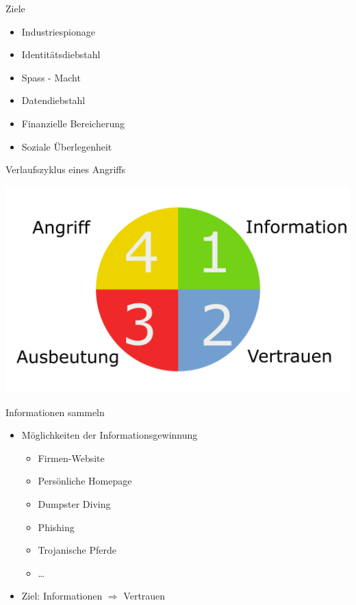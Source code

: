 \documentclass[11pt]{beamer}
\begin{document}
\begin{frame}{Ziele}
  \begin{itemize}
    \item Industriespionage
    \item Identitätsdiebstahl
    \item Spass - Macht
    \item Datendiebstahl
    \item Finanzielle Bereicherung
    \item Soziale Überlegenheit
  \end{itemize}
\end{frame}

\begin{frame}[t]{Verlaufszyklus eines Angriffs}
  \begin{center}
    \includegraphics[height=0.75\textheight]{cycle}
  \end{center}
\end{frame}

\begin{frame}{Informationen sammeln}
  \begin{itemize}
    \item Möglichkeiten der Informationsgewinnung
      \begin{itemize}
      \item Firmen-Website
      \item Persönliche Homepage
      \item Dumpster Diving
      \item Phishing
      \item Trojanische Pferde
      \item \dots
      \end{itemize}
    \item Ziel: Informationen $\Rightarrow$ Vertrauen
  \end{itemize}
\end{frame}
\end{document}
